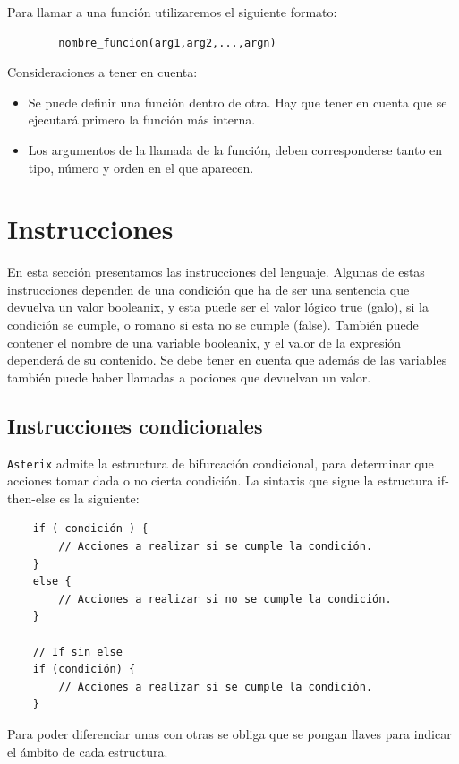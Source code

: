 \documentclass[a4paper, 10pt]{article}
\newcommand{\atx}{\texttt{Asterix} }
\begin{document}
    Para llamar a una función utilizaremos el siguiente formato:
    \begin{verbatim}
        nombre_funcion(arg1,arg2,...,argn)
    \end{verbatim}
    
    Consideraciones a tener en cuenta:
    \begin{itemize}
        \item Se puede definir una función dentro de otra. Hay que tener en
            cuenta que se ejecutará primero la función más interna.
        \item Los argumentos de la llamada de la función, deben corresponderse
            tanto en tipo, número y orden en el que aparecen.
    \end{itemize}

    \section*{Instrucciones}
    En esta sección presentamos las instrucciones del lenguaje. Algunas de estas
    instrucciones dependen de una condición que ha de ser una sentencia que
    devuelva un valor booleanix, y esta puede ser el valor lógico true (galo),
    si la condición se cumple, o romano si esta no se cumple (false). También
    puede contener el nombre de una variable booleanix, y el valor de la
    expresión dependerá de su contenido. Se debe tener en cuenta que además de
    las variables también puede haber llamadas a pociones que devuelvan un
    valor.

    \subsection*{Instrucciones condicionales}
    \atx admite la estructura de bifurcación condicional, para determinar que
    acciones tomar dada o no cierta condición. La sintaxis que sigue la
    estructura if-then-else es la siguiente:
    
    \begin{verbatim}
    if ( condición ) { 
        // Acciones a realizar si se cumple la condición.
    }
    else {
        // Acciones a realizar si no se cumple la condición.
    }

    // If sin else
    if (condición) {
        // Acciones a realizar si se cumple la condición.
    }
    \end{verbatim}
    
    Para poder diferenciar unas con otras se obliga que se pongan llaves para
    indicar el ámbito de cada estructura.
\end{document}

